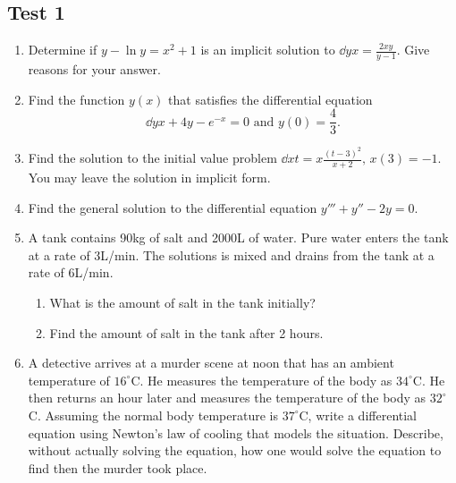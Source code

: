 \subsection{Test 1}

\begin{enumerate}[label=\arabic*.]
	\item 
		Determine if $y - \ln{y} = x^2 + 1$ is an implicit solution to $\dd{y}{x} = \frac{2xy}{y-1}$. Give reasons for your answer.
	\item 
		Find the function $y(x)$ that satisfies the differential equation
		\begin{equation*}
			\dd{y}{x} + 4y - e^{-x} = 0 \text{ and } y(0) = \frac{4}{3}.
		\end{equation*}
	\item
		Find the solution to the initial value problem $\dd{x}{t} = x\frac{(t-3)^2}{x+2} \text{, } x(3) = -1$. You may leave the solution in implicit form.
	\item
		Find the general solution to the differential equation $y''' + y'' - 2y = 0$.
	\item
		A tank contains 90kg of salt and 2000L of water. Pure water enters the tank at a rate of 3L/min. The solutions is mixed and drains from the tank at a rate of 6L/min.
		\begin{enumerate}[label=(\alph*)]
			\item
				What is the amount of salt in the tank initially?
			\item 
				Find the amount of salt in the tank after 2 hours.
		\end{enumerate}
	\item
		A detective arrives at a murder scene at noon that has an ambient temperature of $16^{\circ}$C. He measures the temperature of the body as $34^{\circ}$C. He then returns an hour later and measures the temperature of the body as $32^{\circ}$C.
		Assuming the normal body temperature is $37^{\circ}$C, write a differential equation using Newton's law of cooling that models the situation. Describe, without actually solving the equation, how one would solve the equation to find then the murder took place.
\end{enumerate}